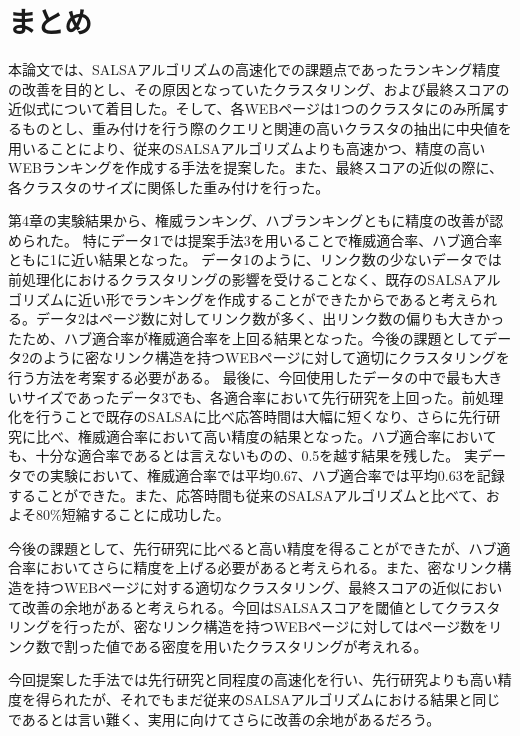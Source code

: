\documentclass[a4paper,11pt]{jreport}
\begin{document}
\chapter{まとめ}

本論文では、SALSAアルゴリズムの高速化での課題点であったランキング精度の改善を目的とし、その原因となっていたクラスタリング、および最終スコアの近似式について着目した。そして、各WEBページは1つのクラスタにのみ所属するものとし、重み付けを行う際のクエリと関連の高いクラスタの抽出に中央値を用いることにより、従来のSALSAアルゴリズムよりも高速かつ、精度の高いWEBランキングを作成する手法を提案した。また、最終スコアの近似の際に、各クラスタのサイズに関係した重み付けを行った。

第4章の実験結果から、権威ランキング、ハブランキングともに精度の改善が認められた。
特にデータ1では提案手法3を用いることで権威適合率、ハブ適合率ともに1に近い結果となった。
データ1のように、リンク数の少ないデータでは前処理化におけるクラスタリングの影響を受けることなく、既存のSALSAアルゴリズムに近い形でランキングを作成することができたからであると考えられる。データ2はページ数に対してリンク数が多く、出リンク数の偏りも大きかったため、ハブ適合率が権威適合率を上回る結果となった。今後の課題としてデータ2のように密なリンク構造を持つWEBページに対して適切にクラスタリングを行う方法を考案する必要がある。
最後に、今回使用したデータの中で最も大きいサイズであったデータ3でも、各適合率において先行研究を上回った。前処理化を行うことで既存のSALSAに比べ応答時間は大幅に短くなり、さらに先行研究に比べ、権威適合率において高い精度の結果となった。ハブ適合率においても、十分な適合率であるとは言えないものの、0.5を越す結果を残した。
実データでの実験において、権威適合率では平均0.67、ハブ適合率では平均0.63を記録することができた。また、応答時間も従来のSALSAアルゴリズムと比べて、およそ80\%短縮することに成功した。


今後の課題として、先行研究に比べると高い精度を得ることができたが、ハブ適合率においてさらに精度を上げる必要があると考えられる。また、密なリンク構造を持つWEBページに対する適切なクラスタリング、最終スコアの近似において改善の余地があると考えられる。今回はSALSAスコアを閾値としてクラスタリングを行ったが、密なリンク構造を持つWEBページに対してはページ数をリンク数で割った値である密度を用いたクラスタリングが考えれる。


今回提案した手法では先行研究と同程度の高速化を行い、先行研究よりも高い精度を得られたが、それでもまだ従来のSALSAアルゴリズムにおける結果と同じであるとは言い難く、実用に向けてさらに改善の余地があるだろう。
\end{document}
